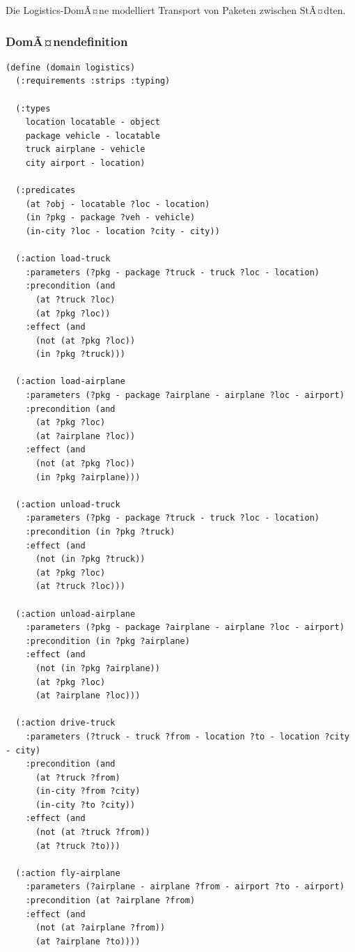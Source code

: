 ﻿\documentclass[a4paper,12pt]{article}
\theoremstyle{definition}
\begin{document}
Die Logistics-DomÃ¤ne modelliert Transport von Paketen zwischen StÃ¤dten.

\subsubsection{DomÃ¤nendefinition}

\begin{lstlisting}[language=PDDL, caption=Logistics DomÃ¤ne]
(define (domain logistics)
  (:requirements :strips :typing)
  
  (:types
    location locatable - object
    package vehicle - locatable
    truck airplane - vehicle
    city airport - location)
  
  (:predicates
    (at ?obj - locatable ?loc - location)
    (in ?pkg - package ?veh - vehicle)
    (in-city ?loc - location ?city - city))
  
  (:action load-truck
    :parameters (?pkg - package ?truck - truck ?loc - location)
    :precondition (and
      (at ?truck ?loc)
      (at ?pkg ?loc))
    :effect (and
      (not (at ?pkg ?loc))
      (in ?pkg ?truck)))
  
  (:action load-airplane
    :parameters (?pkg - package ?airplane - airplane ?loc - airport)
    :precondition (and
      (at ?pkg ?loc)
      (at ?airplane ?loc))
    :effect (and
      (not (at ?pkg ?loc))
      (in ?pkg ?airplane)))
  
  (:action unload-truck
    :parameters (?pkg - package ?truck - truck ?loc - location)
    :precondition (in ?pkg ?truck)
    :effect (and
      (not (in ?pkg ?truck))
      (at ?pkg ?loc)
      (at ?truck ?loc)))
  
  (:action unload-airplane
    :parameters (?pkg - package ?airplane - airplane ?loc - airport)
    :precondition (in ?pkg ?airplane)
    :effect (and
      (not (in ?pkg ?airplane))
      (at ?pkg ?loc)
      (at ?airplane ?loc)))
  
  (:action drive-truck
    :parameters (?truck - truck ?from - location ?to - location ?city - city)
    :precondition (and
      (at ?truck ?from)
      (in-city ?from ?city)
      (in-city ?to ?city))
    :effect (and
      (not (at ?truck ?from))
      (at ?truck ?to)))
  
  (:action fly-airplane
    :parameters (?airplane - airplane ?from - airport ?to - airport)
    :precondition (at ?airplane ?from)
    :effect (and
      (not (at ?airplane ?from))
      (at ?airplane ?to))))
\end{lstlisting}
\end{document}
